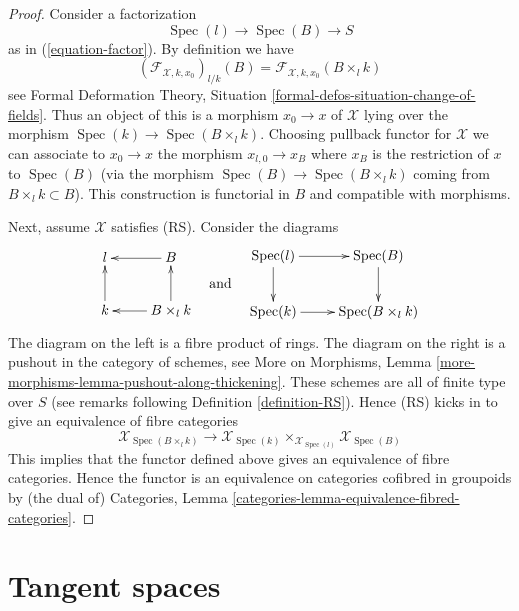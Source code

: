 \documentclass{stacks-project}
\theoremstyle{plain}
\theoremstyle{definition}
\theoremstyle{remark}
\numberwithin{equation}{subsection}
\def\Spec{\mathop{\mathrm{Spec}}}
\begin{document}
\begin{proof}
Consider a factorization
$$
\Spec(l) \to \Spec(B) \to S
$$
as in (\ref{equation-factor}). By definition we have
$$
(\mathcal{F}_{\mathcal{X}, k , x_0})_{l/k}(B) =
\mathcal{F}_{\mathcal{X}, k, x_0}(B \times_l k)
$$
see Formal Deformation Theory, Situation
\ref{formal-defos-situation-change-of-fields}. Thus an object of this
is a morphism $x_0 \to x$ of $\mathcal{X}$ lying over the morphism
$\Spec(k) \to \Spec(B \times_l k)$. Choosing pullback functor for $\mathcal{X}$
we can associate to $x_0 \to x$ the morphism $x_{l, 0} \to x_B$
where $x_B$ is the restriction of $x$ to $\Spec(B)$ (via the morphism
$\Spec(B) \to \Spec(B \times_l k)$ coming from $B \times_l k \subset B$).
This construction is functorial in $B$ and compatible with morphisms.

\medskip\noindent
Next, assume $\mathcal{X}$ satisfies (RS). Consider the diagrams
$$
\vcenter{
\xymatrix{
l & B \ar[l] \\
k \ar[u] & B \times_l k \ar[l] \ar[u]
}
}
\quad\text{and}\quad
\vcenter{
\xymatrix{
\Spec(l) \ar[d] \ar[r] & \Spec(B) \ar[d] \\
\Spec(k) \ar[r] & \Spec(B \times_l k)
}
}
$$
The diagram on the left is a fibre product of rings. The diagram on the
right is a pushout in the category of schemes, see
More on Morphisms, Lemma \ref{more-morphisms-lemma-pushout-along-thickening}.
These schemes are all of finite type over $S$ (see remarks following
Definition \ref{definition-RS}). Hence (RS) kicks in to give an equivalence
of fibre categories
$$
\mathcal{X}_{\Spec(B \times_l k)}
\longrightarrow
\mathcal{X}_{\Spec(k)}
\times_{\mathcal{X}_{\Spec(l)}}
\mathcal{X}_{\Spec(B)}
$$
This implies that the functor defined above gives an equivalence of
fibre categories. Hence the functor is an equivalence on categories
cofibred in groupoids by (the dual of)
Categories, Lemma \ref{categories-lemma-equivalence-fibred-categories}.
\end{proof}








\section{Tangent spaces}
\label{section-tangent-spaces}
\end{document}
